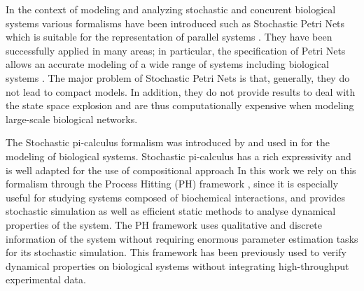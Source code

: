 


In the context of modeling and analyzing stochastic and concurent biological systems various formalisms have been introduced such as 
Stochastic Petri Nets which is suitable for the representation of parallel systems \cite{molloy1982performance}. 
They have been successfully applied in many areas; in particular, the specification of Petri Nets
allows an accurate modeling of a wide range of systems including biological systems \cite{heiner2008petri}. The major 
problem of Stochastic Petri Nets is that, generally, they do not lead to compact models. In addition,
they do not provide results to deal with the state space explosion and are thus computationally
expensive when modeling large-scale biological networks. 

The Stochastic pi-calculus formalism was introduced by \cite{priami1995stochastic} and used in 
\cite{maurin2009modeling} for the modeling of biological systems. Stochastic pi-calculus has a rich
expressivity and is well adapted for the use of compositional approach
In this work we rely on this formalism through the Process Hitting (PH) framework \cite{PMR10-TCSB}, 
since it is especially useful for studying systems composed of biochemical interactions, and provides
stochastic simulation as well as efficient static methods to analyse dynamical properties of the system.
The PH framework uses qualitative and discrete information of the system without requiring enormous parameter estimation tasks
 for its stochastic simulation. 
This framework has been previously used to verify dynamical properties on biological systems without integrating high-throughput experimental data.

